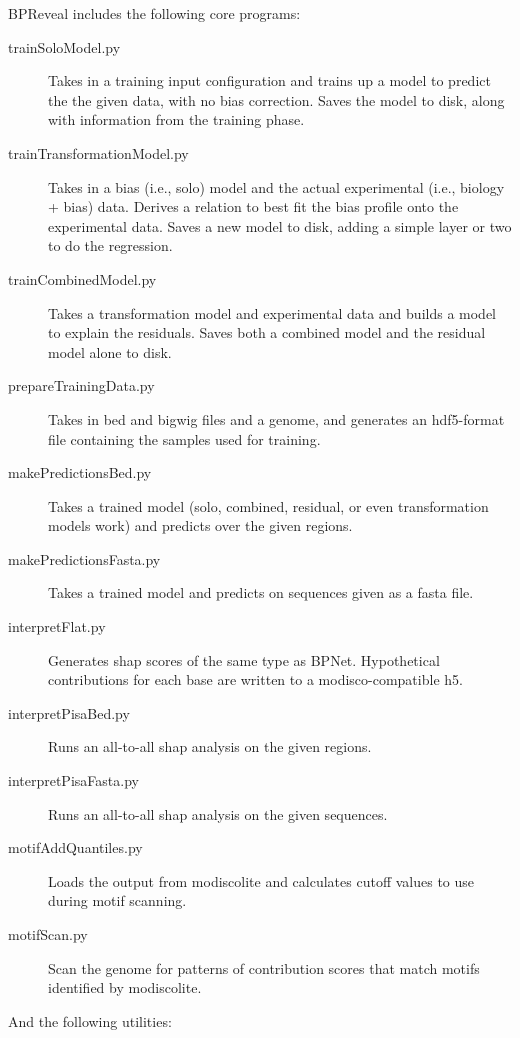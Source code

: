 \documentclass{article}
\begin{document}
BPReveal includes the following core programs:

\begin{description}
    \item [trainSoloModel.py] Takes in a training input configuration and trains up a model to
        predict the the given data, with no bias correction. Saves the model to disk, along with
        information from the training phase.
    \item [trainTransformationModel.py] Takes in a bias (i.e., solo) model and the actual
        experimental (i.e., biology + bias) data. Derives a relation to best fit the bias profile
        onto the experimental data. Saves a new model to disk, adding a simple layer or two to
        do the regression.
    \item [trainCombinedModel.py] Takes a transformation model and experimental data and builds
        a model to explain the residuals. Saves both a combined model and the residual model
        alone to disk.
    \item [prepareTrainingData.py] Takes in bed and bigwig files and a genome, and generates an
        hdf5-format file containing the samples used for training.
    \item [makePredictionsBed.py] Takes a trained model (solo, combined, residual, or even
        transformation models work) and predicts over the given regions.
    \item [makePredictionsFasta.py] Takes a trained model and predicts on sequences given as
        a fasta file.
    \item [interpretFlat.py] Generates shap scores of the same type as BPNet. Hypothetical
        contributions for each base are written to a modisco-compatible h5.
    \item [interpretPisaBed.py] Runs an all-to-all shap analysis on the given regions.
    \item [interpretPisaFasta.py] Runs an all-to-all shap analysis on the given sequences.
    \item [motifAddQuantiles.py] Loads the output from modiscolite and calculates cutoff values
        to use during motif scanning.
    \item [motifScan.py] Scan the genome for patterns of contribution scores that match motifs
        identified by modiscolite.
\end{description}

And the following utilities:
\end{document}

